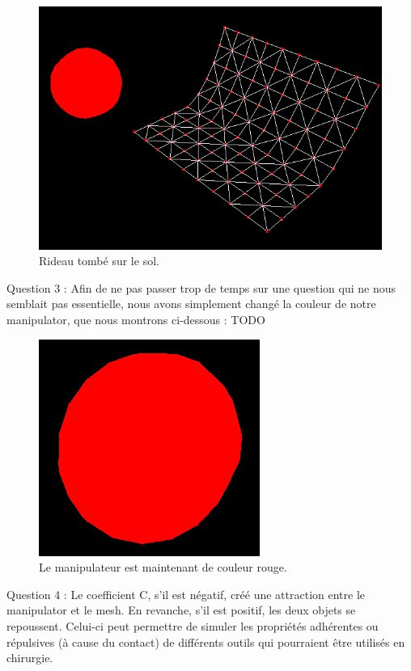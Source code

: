 \documentclass[a4paper,12pt]{article}
\begin{document}
\begin{figure}
  \centering
  \includegraphics{images/sol_image.png}
  \caption{Rideau tombé sur le sol.}
  \label{fig:}
\end{figure}

Question 3 : Afin de ne pas passer trop de temps sur une question qui ne nous semblait pas essentielle, nous avons simplement changé la couleur de notre manipulator, que nous montrons ci-dessous : TODO
\begin{figure}
  \centering
  \includegraphics{images/manipulateur.png}
  \caption{Le manipulateur est maintenant de couleur rouge.}
  \label{fig:}
\end{figure}


Question 4 : Le coefficient C, s'il est négatif, créé une attraction entre le manipulator et le mesh. En revanche, s'il est positif, les deux objets se repoussent. Celui-ci peut permettre de simuler les propriétés adhérentes ou répulsives (à cause du contact) de différents outils qui pourraient être utilisés en chirurgie.
\end{document}
